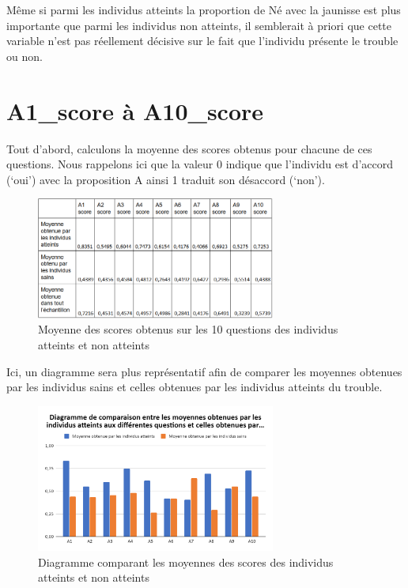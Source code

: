 \documentclass[12,french]{report}
\begin{document}
	Même si parmi les individus atteints la proportion de Né avec la jaunisse est plus importante que parmi les individus non atteints, il semblerait à priori que cette variable n’est pas réellement décisive sur le fait que l’individu présente le trouble ou non.

\section{A1\_score à A10\_score}
	Tout d’abord, calculons la moyenne des scores obtenus pour chacune de ces questions. Nous rappelons ici que la valeur 0 indique que l’individu est d’accord (‘oui’)  avec la proposition A ainsi 1 traduit son désaccord (‘non’).\\

\begin{figure}[H]
	\center
	\includegraphics[width=0.7\textwidth]{./Images/9}
	\caption{Moyenne des scores obtenus sur les 10 questions des individus atteints et non atteints}
\end{figure}\vspace{0.1cm}

	Ici, un diagramme sera plus représentatif afin de comparer les moyennes obtenues par les individus sains et celles obtenues par les individus atteints du trouble.\\

\begin{figure}[H]
	\center
	\includegraphics[width=0.7\textwidth]{./Images/10}
	\caption{Diagramme comparant les moyennes des scores des individus atteints et non atteints}
\end{figure}\vspace{0.1cm}
\end{document}
